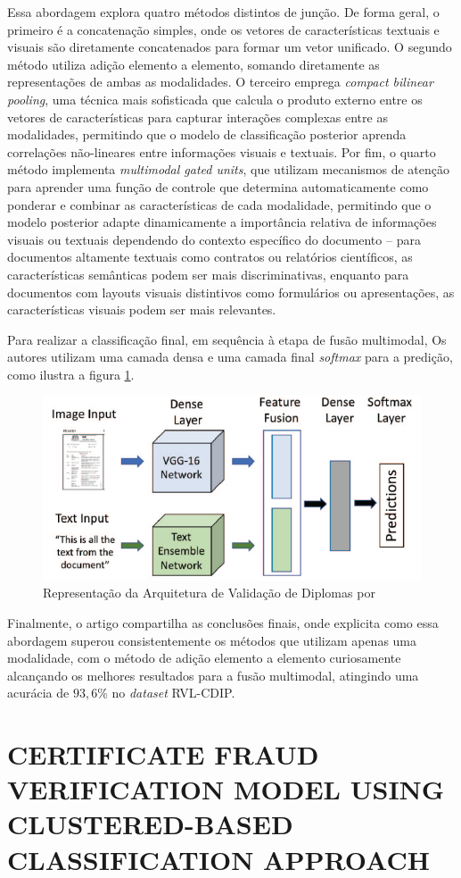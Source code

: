 Essa abordagem explora quatro métodos distintos de junção. De forma geral, o primeiro é a concatenação simples, onde os vetores de características textuais e visuais são diretamente concatenados para formar um vetor unificado. O segundo método utiliza adição elemento a elemento, somando diretamente as representações de ambas as modalidades. O terceiro emprega \textit{compact bilinear pooling}, uma técnica mais sofisticada que calcula o produto externo entre os vetores de características para capturar interações complexas entre as modalidades, permitindo que o modelo de classificação posterior aprenda correlações não-lineares entre informações visuais e textuais. Por fim, o quarto método implementa \textit{multimodal gated units}, que utilizam mecanismos de atenção para aprender uma função de controle que determina automaticamente como ponderar e combinar as características de cada modalidade, permitindo que o modelo posterior adapte dinamicamente a importância relativa de informações visuais ou textuais dependendo do contexto específico do documento -- para documentos altamente textuais como contratos ou relatórios científicos, as características semânticas podem ser mais discriminativas, enquanto para documentos com layouts visuais distintivos como formulários ou apresentações, as características visuais podem ser mais relevantes.

Para realizar a classificação final, em sequência à etapa de fusão multimodal, Os autores utilizam uma camada densa e uma camada final \textit{softmax} para a predição, como ilustra a figura \ref{fig:multimodal}.

\begin{figure}[H]
	\caption{\label{fig:multimodal}Representação da Arquitetura de Validação de Diplomas por \citeauthor*{multimodal}}
    \begin{center}
    \includegraphics[width=1\linewidth]{images/multimodal.png}
	\end{center}
\end{figure}

Finalmente, o artigo compartilha as conclusões finais, onde explicita como essa abordagem superou consistentemente os métodos que utilizam apenas uma modalidade, com o método de adição elemento a elemento curiosamente alcançando os melhores resultados para a fusão multimodal, atingindo uma acurácia de $93,6$\% no \textit{dataset} RVL-CDIP.

\section{CERTIFICATE FRAUD VERIFICATION MODEL USING CLUSTERED-BASED CLASSIFICATION APPROACH}